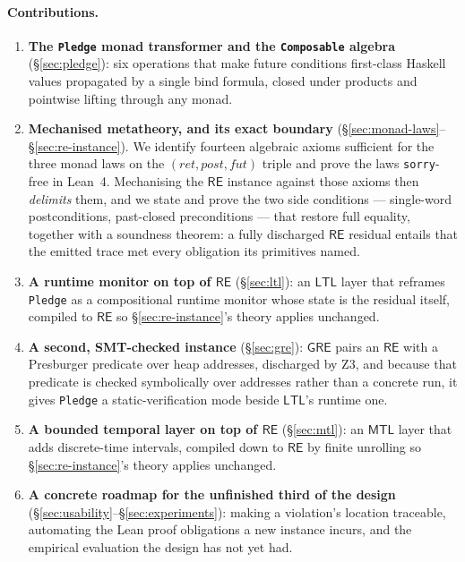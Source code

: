 \documentclass[acmsmall,screen]{acmart}
\newcommand{\RE}{\mathsf{RE}}
\newcommand{\GRE}{\mathsf{GRE}}
\newcommand{\LTL}{\mathsf{LTL}}
\newcommand{\MTL}{\mathsf{MTL}}
\newcommand{\post}{\mathit{post}}
\newcommand{\fut}{\mathit{fut}}
\newcommand{\ret}{\mathit{ret}}
\begin{document}
\paragraph{Contributions.}
\begin{enumerate}
  \item \textbf{The \lstinline{Pledge} monad transformer and the
        \lstinline{Composable} algebra} (\S\ref{sec:pledge}): six operations
        that make future conditions first-class Haskell values propagated
        by a single bind formula, closed under products and pointwise
        lifting through any monad.

  \item \textbf{Mechanised metatheory, and its exact boundary}
        (\S\ref{sec:monad-laws}--\S\ref{sec:re-instance}).
        We identify fourteen algebraic axioms sufficient for the three monad
        laws on the $(\ret, \post, \fut)$ triple and prove the laws
        \lstinline{sorry}-free in Lean~4.
        Mechanising the $\RE$ instance against those axioms then
        \emph{delimits} them, and we state and prove the two side
        conditions --- single-word postconditions, past-closed
        preconditions --- that restore full equality, together with a
        soundness theorem: a fully discharged $\RE$ residual entails that
        the emitted trace met every obligation its primitives named.

  \item \textbf{A runtime monitor on top of $\RE$} (\S\ref{sec:ltl}): an
        $\LTL$ layer that reframes \lstinline{Pledge} as a compositional
        runtime monitor whose state is the residual itself, compiled to
        $\RE$ so \S\ref{sec:re-instance}'s theory applies unchanged.

  \item \textbf{A second, SMT-checked instance} (\S\ref{sec:gre}): $\GRE$
        pairs an $\RE$ with a Presburger predicate over heap addresses,
        discharged by Z3, and because that predicate is checked
        symbolically over addresses rather than a concrete run, it gives
        \lstinline{Pledge} a static-verification mode beside $\LTL$'s
        runtime one.

  \item \textbf{A bounded temporal layer on top of $\RE$}
        (\S\ref{sec:mtl}): an $\MTL$ layer that adds discrete-time
        intervals, compiled down to $\RE$ by finite unrolling so
        \S\ref{sec:re-instance}'s theory applies unchanged.

  \item \textbf{A concrete roadmap for the unfinished third of the design}
        (\S\ref{sec:usability}--\S\ref{sec:experiments}): making a
        violation's location traceable, automating the Lean proof
        obligations a new instance incurs, and the empirical evaluation the
        design has not yet had.
\end{enumerate}
\end{document}
